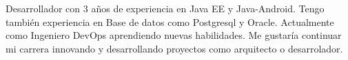 \par{
Desarrollador con 3 años de experiencia en Java EE y Java-Android. Tengo también
experiencia en Base de datos como Postgresql y Oracle. Actualmente como
Ingeniero DevOps aprendiendo nuevas habilidades. Me gustaría continuar mi carrera innovando y desarrollando
proyectos como arquitecto o desarrolador.
}
